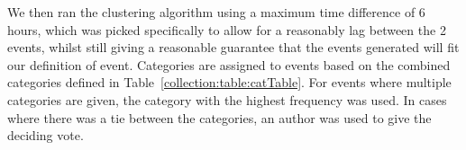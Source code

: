 We then ran the clustering algorithm using a maximum time difference of 6 hours, which was picked specifically to allow for a reasonably lag between the 2 events, whilst still giving a reasonable guarantee that the events generated will fit our definition of event.
Categories are assigned to events based on the combined categories defined in Table~\ref{collection:table:catTable}.
For events where multiple categories are given, the category with the highest frequency was used.
In cases where there was a tie between the categories, an author was used to give the deciding vote.